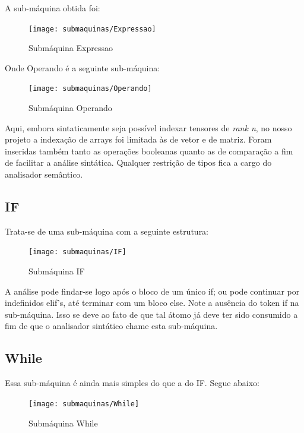 \documentclass[a4paper,12pt]{report}
\begin{document}
    A sub-máquina obtida foi:

    \begin{figure}[h]
        \centering
        \caption{Submáquina Expressao}    
        \texttt{[image: submaquinas/Expressao]}
    \end{figure}

    Onde Operando é a seguinte sub-máquina:

    \begin{figure}[h]
        \centering
        \caption{Submáquina Operando}    
        \texttt{[image: submaquinas/Operando]}
    \end{figure}

    Aqui, embora sintaticamente seja possível indexar tensores de \textit{rank n}, no nosso projeto a indexação de arrays foi limitada às de vetor e de matriz. Foram inseridas também tanto as operações booleanas quanto as de comparação a fim de facilitar a análise sintática. Qualquer restrição de tipos fica a cargo do analisador semântico.

    \subsection*{IF}
    Trata-se de uma sub-máquina com a seguinte estrutura:
    \begin{figure}[h]
        \centering
        \caption{Submáquina IF}    
        \texttt{[image: submaquinas/IF]}
    \end{figure}
    A análise pode findar-se logo após o bloco de um único if; ou pode continuar por indefinidos elif's, até terminar com um bloco else. Note a ausência do token if na sub-máquina. Isso se deve ao fato de que tal átomo já deve ter sido consumido a fim de que o analisador sintático chame esta sub-máquina.

    \subsection*{While}
    Essa sub-máquina é ainda mais simples do que a do IF. Segue abaixo:
    \begin{figure}[h]
        \centering
        \caption{Submáquina While}    
        \texttt{[image: submaquinas/While]}
    \end{figure}

\end{document}

